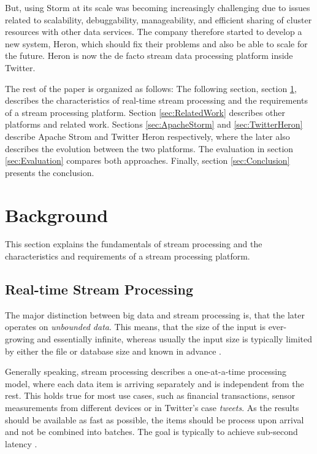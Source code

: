 \documentclass[conference]{IEEEtran}
\begin{document}
But, using Storm at its scale was becoming increasingly challenging due to issues related to scalability, debuggability, manageability, and efficient sharing of cluster resources with other data services.
The company therefore started to develop a new system, Heron, which should fix their problems and also be able to scale for the future.
Heron is now the de facto stream data processing platform inside Twitter.

The rest of the paper is organized as follows: The following section, section \ref{sec:Background}, describes the characteristics of real-time stream processing and the requirements of a stream processing platform.
Section \ref{sec:RelatedWork} describes other platforms and related work.
Sections \ref{sec:ApacheStorm} and \ref{sec:TwitterHeron} describe Apache Strom and Twitter Heron respectively, where the later also describes the evolution between the two platforms.
The evaluation in section \ref{sec:Evaluation} compares both approaches.
Finally, section \ref{sec:Conclusion} presents the conclusion.

\section{Background}
\label{sec:Background}

This section explains the fundamentals of stream processing and the characteristics and requirements of a stream processing platform.

\subsection{Real-time Stream Processing}
\label{sec:RealTimeStreamProcessing}

The major distinction between big data and stream processing is, that the later operates on \emph{unbounded data}.
This means, that the size of the input is ever-growing and essentially infinite, whereas usually the input size is typically limited by either the file or database size and known in advance \cite{WorldBeyondBatch}.

Generally speaking, stream processing describes a one-at-a-time processing model, where each data item is arriving separately and is independent from the rest.
This holds true for most use cases, such as financial transactions, sensor measurements from different devices or in Twitter's case \emph{tweets}.
As the results should be available as fast as possible, the items should be process upon arrival and not be combined into batches.
The goal is typically to achieve sub-second latency \cite{BeyondBatchProcessing}.
\end{document}

